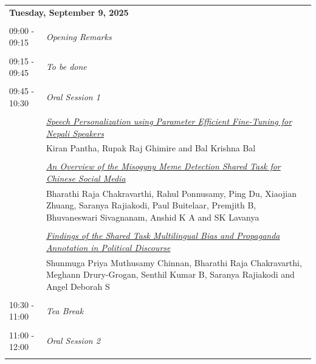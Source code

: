 \documentclass[11pt,oneside]{book}
\begin{document}
        \begin{tabular}{p{24mm}p{124mm}}
    \multicolumn{2}{l}{\bf Tuesday, September 9, 2025 } \\\\
                09:00 - 09:15 & \emph{Opening Remarks}\\\\
      
                      09:15 - 09:45 & \emph{To be done}\\\\
      
                      09:45 - 10:30 & \emph{Oral Session 1}\\\\
      
                
                      & \hyperlink{page.189}{\emph{Speech Personalization using Parameter Efficient Fine-Tuning for Nepali Speakers}}\\
        & Kiran Pantha\index{Pantha}, Rupak Raj Ghimire\index{Ghimire} and Bal Krishna Bal\index{Bal}\\\\
                
                      & \hyperlink{page.199}{\emph{An Overview of the Misogyny Meme Detection Shared Task for Chinese Social Media}}\\
        & Bharathi Raja Chakravarthi\index{Chakravarthi}, Rahul Ponnusamy\index{Ponnusamy}, Ping Du\index{Du}, Xiaojian Zhuang\index{Zhuang}, Saranya Rajiakodi\index{Rajiakodi}, Paul Buitelaar\index{Buitelaar}, Premjith B\index{B}, Bhuvaneswari Sivagnanam\index{Sivagnanam}, Anshid K A\index{A} and SK Lavanya\index{Lavanya}\\\\
                
                      & \hyperlink{page.208}{\emph{Findings of the Shared Task Multilingual Bias and Propaganda Annotation in Political Discourse}}\\
        & Shunmuga Priya Muthusamy Chinnan\index{Chinnan}, Bharathi Raja Chakravarthi\index{Chakravarthi}, Meghann Drury-Grogan\index{Drury-Grogan}, Senthil Kumar B\index{B}, Saranya Rajiakodi\index{Rajiakodi} and Angel Deborah S\index{S}\\\\
                      10:30 - 11:00 & \emph{Tea Break}\\\\
      
                      11:00 - 12:00 & \emph{Oral Session 2}\\\\
      

\end{tabular}
\end{document}
